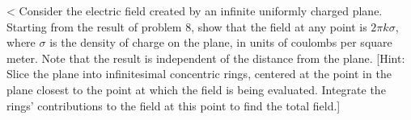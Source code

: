 <%
Consider the electric field created by an infinite
uniformly charged plane. Starting from the result of problem
8, show that the field at any point is $2\pi k\sigma$,
where $\sigma$ is the density of charge on the plane, in
units of coulombs per square meter. Note that the result is
independent of the distance from the plane. [Hint: Slice the
plane into infinitesimal concentric rings, centered at the
point in the plane closest to the point at which the field
is being evaluated. Integrate the rings' contributions to
the field at this point to find the total field.]
